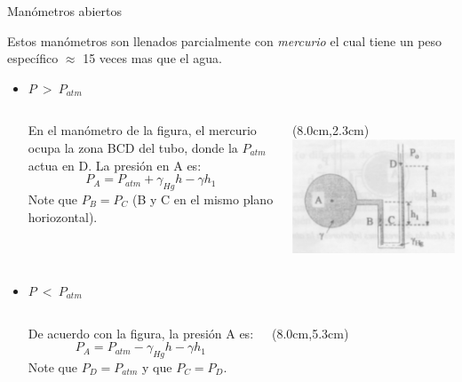 \documentclass [xcolor=svgnames, t] {beamer}
\begin{document}
\begin{frame}{Man\'ometros abiertos}
\vspace{-0.5cm}
\small
\begin{block}{}
Estos man\'ometros son llenados parcialmente con \emph{mercurio} el cual tiene un peso espec\'ifico $\approx$ 15 veces mas que el agua. 
\end{block}
\begin{itemize}
\item $P\ >\ P_{atm}$
\begin{columns}
En el man\'ometro de la figura, el mercurio ocupa la zona BCD del tubo, donde la $P_{atm}$ actua en D. La presi\'on en A es:
$$
P_A = P_{atm}+\gamma_{Hg}h - \gamma h_1
$$
Note que $P_B = P_C$ (B y C en el mismo plano horiozontal).
\begin{textblock*}{4.5cm}(8.0cm,2.3cm) %
\includegraphics[width=\textwidth]{manome1}
\end{textblock*}
\end{columns}
\item $P\ <\ P_{atm}$
\begin{columns}
De acuerdo con la figura, la presi\'on A es:
$$
P_A = P_{atm}-\gamma_{Hg}h - \gamma h_1
$$
Note que $P_D = P_{atm}$ y que $P_C = P_D$.
\begin{textblock*}{4.5cm}(8.0cm,5.3cm) %

\end{textblock*}
\end{columns}
\end{itemize}
\end{frame}
\end{document}
